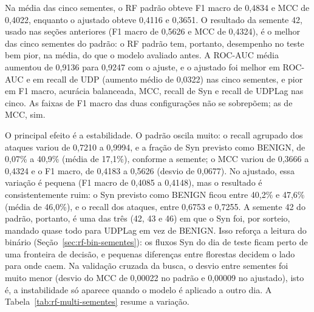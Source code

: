 \documentclass[
    12pt,                %
    openright,           %
    oneside,             %
    a4paper,             %
    english,             %
    brazil               %
]{abntex2}
\begin{document}
Na média das cinco sementes, o RF padrão obteve F1 macro de 0,4834 e MCC de 0,4022, enquanto o ajustado obteve 0,4116 e 0,3651. O resultado da semente 42, usado nas seções anteriores (F1 macro de 0,5626 e MCC de 0,4324), é o melhor das cinco sementes do padrão: o RF padrão tem, portanto, desempenho no teste bem pior, na média, do que o modelo avaliado antes. A ROC-AUC média aumentou de 0,9136 para 0,9247 com o ajuste, e o ajustado foi melhor em ROC-AUC e em recall de UDP (aumento médio de 0,0322) nas cinco sementes, e pior em F1 macro, acurácia balanceada, MCC, recall de Syn e recall de UDPLag nas cinco. As faixas de F1 macro das duas configurações não se sobrepõem; as de MCC, sim.
 
O principal efeito é a estabilidade. O padrão oscila muito: o recall agrupado dos ataques variou de 0,7210 a 0,9994, e a fração de Syn previsto como BENIGN, de 0,07\% a 40,9\% (média de 17,1\%), conforme a semente; o MCC variou de 0,3666 a 0,4324 e o F1 macro, de 0,4183 a 0,5626 (desvio de 0,0677). No ajustado, essa variação é pequena (F1 macro de 0,4085 a 0,4148), mas o resultado é consistentemente ruim: o Syn previsto como BENIGN ficou entre 40,2\% e 47,6\% (média de 46,0\%), e o recall dos ataques, entre 0,6753 e 0,7255. A semente 42 do padrão, portanto, é uma das três (42, 43 e 46) em que o Syn foi, por sorteio, mandado quase todo para UDPLag em vez de BENIGN. Isso reforça a leitura do binário (Seção~\ref{sec:rf-bin-sementes}): os fluxos Syn do dia de teste ficam perto de uma fronteira de decisão, e pequenas diferenças entre florestas decidem o lado para onde caem. Na validação cruzada da busca, o desvio entre sementes foi muito menor (desvio do MCC de 0,00022 no padrão e 0,00009 no ajustado), isto é, a instabilidade só aparece quando o modelo é aplicado a outro dia. A Tabela~\ref{tab:rf-multi-sementes} resume a variação.
 
\end{document}
